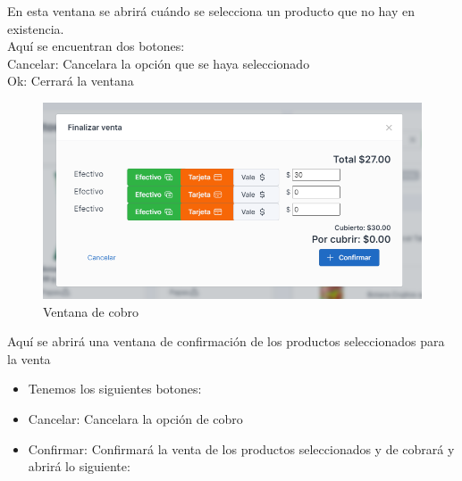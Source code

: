 \documentclass[a4paper,DIV=12]{scrreprt}
\begin{document}
	En esta ventana se abrirá cuándo se selecciona un producto que no hay en existencia.\\
	 Aquí se encuentran dos botones:\\
	Cancelar: Cancelara la opción que se haya seleccionado\\
	Ok: Cerrará la ventana \\
	\begin{figure}[!htb]
		\centering
		\includegraphics[scale=0.4]{VENTAS8.PNG}
		\caption{Ventana de cobro}
	\end{figure}
	Aquí se abrirá una ventana de confirmación de los productos seleccionados para la venta\\
	\begin{itemize}
	
	\item Tenemos los siguientes botones:
	\item Cancelar: Cancelara la opción de cobro
	\item Confirmar: Confirmará la venta de los productos seleccionados y de cobrará y abrirá lo siguiente:
	    
	\end{itemize}
	
\end{document}
